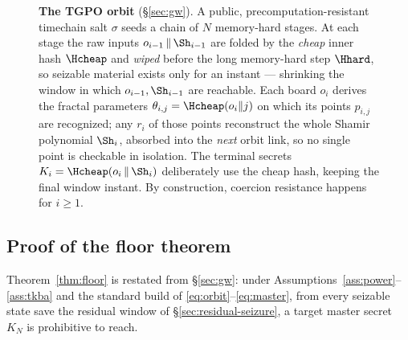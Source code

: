 \begin{figure}[t]
{}
\caption{\textbf{The TGPO orbit} (\S\ref{sec:gw}). A public,
precomputation-resistant timechain salt $\sigma$ seeds a
chain of $N$ memory-hard stages. At each stage the raw inputs
$o_{i-1}\,\|\,\Sh_{i-1}$ are folded by the \emph{cheap} inner hash $\Hcheap$ and
\emph{wiped} before the long memory-hard step $\Hhard$, so seizable material
exists only for an instant --- shrinking the window in which $o_{i-1}, \Sh_{i-1}$ are
reachable. Each board $o_i$ derives the fractal parameters
$\theta_{i,j} = \Hcheap(o_i \| j)$ on which its points $p_{i,j}$ are recognized; any
$r_i$ of those points reconstruct the whole Shamir polynomial $\Sh_i$, absorbed into
the \emph{next} orbit link, so no single point is checkable in isolation. The terminal secrets $K_i =
\Hcheap(o_i \,\|\, \Sh_i)$ deliberately use the cheap hash, keeping the final window
instant. By construction, coercion resistance happens for $i \geq 1$.}
\label{fig:orbit}
\end{figure}

\subsection{Proof of the floor theorem}
\label{app:tgpo-floor}

\noindent Theorem~\ref{thm:floor} is restated from \S\ref{sec:gw}: under
Assumptions~\ref{ass:power}--\ref{ass:tkba} and the standard build of
\eqref{eq:orbit}--\eqref{eq:master}, from every seizable state save the residual
window of \S\ref{sec:residual-seizure}, a target master secret $K_N$ is
prohibitive to reach.

